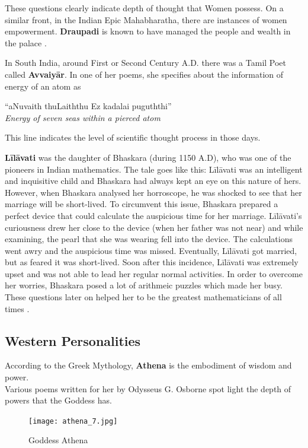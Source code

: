 \documentclass[a4paper,10pt]{article}
\begin{document}
These questions clearly indicate depth of thought that Women possess. On a similar front, in the Indian Epic Mahabharatha, there are instances of women empowerment. \textbf{Draupadi} is known to have managed the people and wealth in the palace \cite{mahabharatha}. 

In South India, around First or Second Century A.D. there was a Tamil Poet called \textbf{Avvaiy\={a}r}. In one of her poems, she specifies about the information of energy of an atom as \\
\begin{center}
``aNuvaith thuLaiththu Ez kadalai puguththi'' \\
\textit{Energy of seven seas within a pierced atom}\\
\end{center}
This line indicates the level of scientific thought process in those days. 

\textbf{L\={i}l\={a}vati} was the daughter of Bhaskara (during 1150 A.D), who was one of the pioneers in Indian mathematics. The tale goes like this: L\={i}l\={a}vati was an intelligent and inquisitive child and Bhaskara had always kept an eye on this nature of hers. However, when Bhaskara analysed her horroscope, he was shocked to see that her marriage will be short-lived. To circumvent this issue, Bhaskara prepared a perfect device that could calculate the auspicious time for her marriage. L\={i}l\={a}vati's curiousness drew her close to the device (when her father was not near) and while examining, the pearl that she was wearing fell into the device. The calculations went awry and the auspicious time was missed. Eventually, L\={i}l\={a}vati got married, but as feared it was short-lived. Soon after this incidence, L\={i}l\={a}vati was extremely upset and was not able to lead her regular normal activities. In order to overcome her worries, Bhaskara posed a lot of arithmeic puzzles which made her busy. These 
questions later on helped her to be the 
greatest mathematicians of all times \cite{lilavati}. 

\subsection{Western Personalities}
\newblock
According to the Greek Mythology, \textbf{Athena} is the embodiment of wisdom and power.\\
Various poems written for her by Odysseus G. Osborne spot light the depth of powers that the Goddess has.\\
\begin{center}
\begin{figure}[h]
\centering
 \texttt{[image: athena\_7.jpg]}
 \caption{Goddess Athena}
\end{figure}
\end{center}
\end{document}
